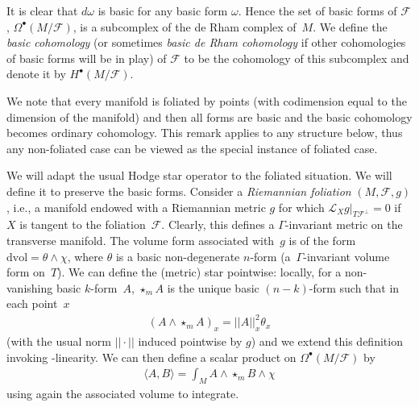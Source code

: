 \documentclass[10pt,a4paper]{amsart}
\numberwithin{equation}{section}
\begin{document}
It is clear that $d\omega$ is basic for any basic form $\omega$. Hence the set of basic forms of $\mathcal{F}$, $\Omega^{\bullet}(M\slash\mathcal{F})$, is a subcomplex of the de Rham complex of~$M$. We define the \emph{basic cohomology} (or sometimes \emph{basic de Rham cohomology} if other cohomologies of basic forms will be in play) of $\mathcal{F}$ to be the cohomology of this subcomplex and denote it by $H^{\bullet}(M\slash\mathcal{F})$.

We note that every manifold is foliated by points (with codimension equal to the dimension of the manifold) and then all forms are basic and the basic cohomology becomes ordinary cohomology. This remark applies to any structure below, thus any non-foliated case can be viewed as the special instance of foliated case.

We will adapt the usual Hodge star operator to the foliated situation. We will define it to preserve the basic forms. Consider a \emph{Riemannian foliation} $(M,\mathcal{F},g)$, i.e., a manifold endowed with a Riemannian metric $g$ for which $\mathcal{L}_Xg|_{T\mathcal{F}^{\bot}}=0$ if $X$ is tangent to the foliation~$\mathcal{F}$. Clearly, this defines a $\Gamma$-invariant metric on the transverse manifold. The volume form associated with~$g$ is of the form $\text{dvol} =\theta\wedge \chi$, where $\theta$ is a basic non-degenerate $n$-form (a~$\Gamma$-invariant volume form on~$T$). We can define the (metric) star pointwise: locally, for a non-vanishing basic $k$-form~$A$, $\star_{m} A$ is the unique basic $(n-k)$-form such that in each point~$x$
\begin{gather*}
(A\wedge\star_{m} A)_x=||A||^2_x\theta_x
\end{gather*}
(with the usual norm $||\cdot||$ induced pointwise by $g$) and we extend this definition invoking -linearity. We can then define a scalar product on $\Omega^{\bullet}(M\slash\mathcal{F})$ by
\begin{gather*}
\langle A,B\rangle = \int_{M} A\wedge \star_{m} B\wedge \chi
\end{gather*}
using again the associated volume to integrate.
\end{document}
